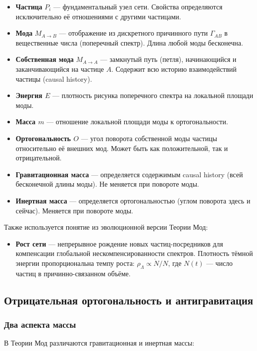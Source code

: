 \documentclass[12pt,a4paper]{article}
\begin{document}
\begin{itemize}
    \item \textbf{Частица} $P_i$ --- фундаментальный узел сети. Свойства определяются исключительно её отношениями с другими частицами.
    \item \textbf{Мода} $M_{A \to B}$ --- отображение из дискретного причинного пути $\Gamma_{AB}$ в вещественные числа (поперечный спектр). Длина любой моды бесконечна.
    \item \textbf{Собственная мода} $M_{A \to A}$ --- замкнутый путь (петля), начинающийся и заканчивающийся на частице $A$. Содержит всю историю взаимодействий частицы (causal history).
    \item \textbf{Энергия $E$} --- плотность рисунка поперечного спектра на локальной площади моды.
    \item \textbf{Масса $m$} --- отношение локальной площади моды к ортогональности.
    \item \textbf{Ортогональность $O$} --- угол поворота собственной моды частицы относительно её внешних мод. Может быть как положительной, так и отрицательной.
    \item \textbf{Гравитационная масса} --- определяется содержимым causal history (всей бесконечной длины моды). Не меняется при повороте моды.
    \item \textbf{Инертная масса} --- определяется ортогональностью (углом поворота здесь и сейчас). Меняется при повороте моды.
\end{itemize}

Также используется понятие из эволюционной версии Теории Мод:
\begin{itemize}
    \item \textbf{Рост сети} --- непрерывное рождение новых частиц-посредников для компенсации глобальной нескомпенсированности спектров. Плотность тёмной энергии пропорциональна темпу роста: $\rho_\Lambda \propto \dot{N}/N$, где $N(t)$ --- число частиц в причинно-связанном объёме.
\end{itemize}

\subsection{Отрицательная ортогональность и антигравитация}

\subsubsection{Два аспекта массы}
В Теории Мод различаются гравитационная и инертная массы:
\end{document}
